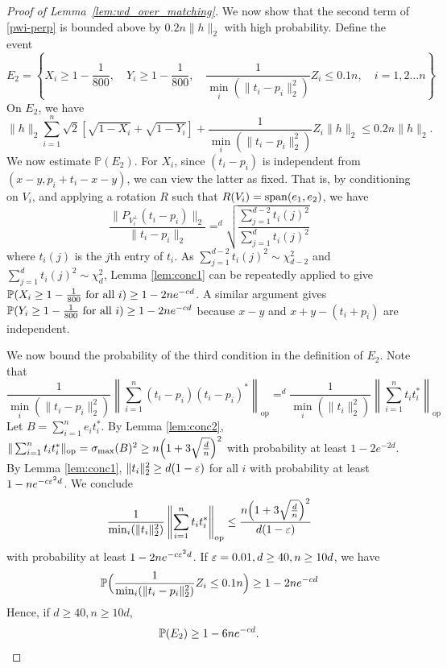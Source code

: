 \begin{proof}[Proof of Lemma~\ref{lem:wd_over_matching}]
We now show that the second term of \eqref{pwi-perp} is bounded above by $0.2 n \|h\|_2$ with high probability.
Define the event
\[
E_2 = \left\{ X_i \geq 1 - \frac{1}{800}, \quad Y_i \geq 1 - \frac{1}{800}, \quad \frac{1}{\min_i(\|t_i - p_i\|_2^2)}Z_i \leq 0.1 n, \quad i = 1,2\ldots n \right\}
\]
On $E_2$, we have
\[
 \|h\|_2 \sum_{i=1}^n \sqrt{2}\left[ \sqrt{1 - X_i} + \sqrt{1 - Y_i} \right]  + \frac{1}{\min_i(\|t_i - p_i\|_2^2)}Z_i\|h\|_2 \leq 0.2 n \|h\|_2.
\]
We now estimate $\mathbb{P}(E_2)$. For $X_i$, since $ (t_i - p_i)$ is independent from $(x-y, p_i + t_i - x-y)$, we can view the latter as fixed. That is, by conditioning on $V_i$, and applying a rotation $R$ such  that $R(V_i) = \Span(e_1,e_2)$, we have
\[
 \frac{\| P_{V_i^\perp} (t_i-p_i) \|_2}{\|t_i-p_i\|_2} =^d \sqrt{\frac{\sum_{j=1}^{d-2}t_i (j)^2}{\sum_{j=1}^{d}t_i (j)^2}} %
\] 
where $t_i(j)$ is the $j$th entry of $t_i$.  As $\sum_{j=1}^{d-2}t_i (j)^2 \sim \chi^2_{d-2}$ and $\sum_{j=1}^{d}t_i (j)^2 \sim \chi^2_{d}$, Lemma \ref{lem:conc1} can be repeatedly applied to give $\P(X_i \geq 1 - \frac{1}{800} \text{ for all } i) \geq 1 - 2 n e^{-cd}$. 
A similar argument gives $\P(Y_i \geq 1 - \frac{1}{800} \text{ for all } i) \geq 1 - 2n e^{-cd}$ because  $x-y$ and $x+y-(t_i+p_i)$ are independent.


We now bound the probability of the third condition in the definition of $E_2$.  Note that 
\[
\frac{1}{\min_i(\|t_i - p_i\|_2^2)}\left \|\sum_{i=1}^n (t_i-p_i)(t_i-p_i)^*\right\|_{\text{op}} =^d \frac{1}{\min_i(\|t_i \|_2^2)}\left \|\sum_{i=1}^n t_i t_i^*\right\|_{\text{op}}
\]
Let $B = \sum_{i=1}^n e_i t_i^*$.  By Lemma \ref{lem:conc2}, $\| \sum_{i=1}^n t_i t_i^*\|_\text{op} = \sigma_\text{max}(B)^2 \geq n \Bigl(1 + 3 \sqrt{\frac{d}{n}} \Bigr)^2$ with probability at least $1 - 2 e^{-2d}$.
By Lemma \ref{lem:conc1}, $\|t_i\|_2^2 \geq d(1-\eps)$ for all $i$ with probability at least $1 - n e^{-c \eps^2 d}$.  We conclude
\[
 \frac{1}{\min_i(\|t_i \|_2^2)}\left \|\sum_{i=1}^n t_i t_i^*\right\|_{\text{op}} \leq \frac{n \Bigl(1 + 3 \sqrt{\frac{d}{n}} \Bigr)^2}{d (1-\eps)}
\]
with probability at least $1 - 2n e^{-c \eps^2 d}$.
If $\eps = 0.01, d \geq 40, n \geq 10d$, we have
\[
\P\Bigl( \frac{1}{\min_i(\|t_i - p_i\|_2^2)}Z_i \leq 0.1 n \Bigr)  \geq 1 - 2n e^{-cd}
\]
Hence, if $d \geq 40, n \geq 10 d$,
\[
\P(E_2) \geq 1 - 6n e^{-cd}.
\]



\end{proof}
